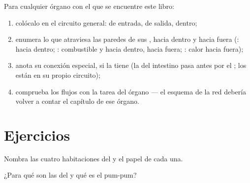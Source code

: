 \begin{method}\label{met:g7:heart-and-circulation:map}
Para cualquier órgano con el que se encuentre este libro:
\begin{enumerate}
  \item colócalo en el circuito general:  de entrada,  de
        salida,  dentro;
  \item enumera lo que atraviesa las paredes de sus , hacia
        dentro y hacia fuera (:  hacia dentro;
        : combustible y  hacia dentro, 
        hacia fuera; : calor hacia fuera);
  \item anota su conexión especial, si la tiene (la  del
        intestino pasa antes por el ; los  están en su
        propio circuito);
  \item comprueba los flujos con la tarea del órgano --- el esquema de
        la red debería volver a contar el capítulo de ese órgano.
\end{enumerate}
\end{method}

\section{Ejercicios}

\begin{exercise}[$\star$]\label{exo:g7:heart-and-circulation:1}
Nombra las cuatro habitaciones del  y el papel de cada una.
\end{exercise}

\begin{exercise}[$\star$]\label{exo:g7:heart-and-circulation:2}
¿Para qué son las  del  y qué es el pum-pum?
\end{exercise}

